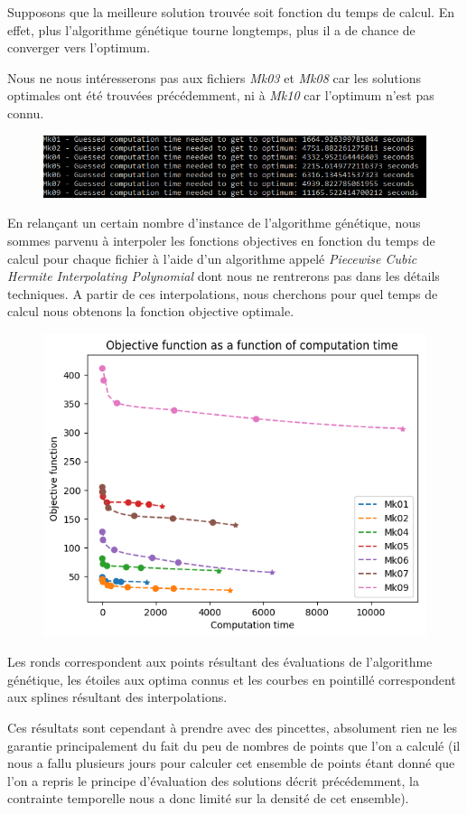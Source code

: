 Supposons que la meilleure solution trouvée soit fonction du temps de calcul. En effet, plus l'algorithme génétique tourne longtemps, plus il a de chance de converger vers l'optimum.

Nous ne nous intéresserons pas aux fichiers \textit{Mk03} et \textit{Mk08} car les solutions optimales ont été trouvées précédemment, ni à \textit{Mk10} car l'optimum n'est pas connu.

\begin{figure}[!h]
    \centering
    \includegraphics[width=\linewidth]{report/Pictures/guessed_computation_time_brandimarte.png}
\end{figure}

En relançant un certain nombre d'instance de l'algorithme génétique, nous sommes parvenu à interpoler les fonctions objectives en fonction du temps de calcul pour chaque fichier à l'aide d'un algorithme appelé \textit{Piecewise Cubic Hermite Interpolating Polynomial} dont nous ne rentrerons pas dans les détails techniques. A partir de ces interpolations, nous cherchons pour quel temps de calcul nous obtenons la fonction objective optimale.

\begin{figure}[!h]
    \centering
    \includegraphics[width=\linewidth]{report/Pictures/objective_function_as_function_of_time.png}
\end{figure}

Les ronds correspondent aux points résultant des évaluations de l'algorithme génétique, les étoiles aux optima connus et les courbes en pointillé correspondent aux splines résultant des interpolations.

Ces résultats sont cependant à prendre avec des pincettes, absolument rien ne les garantie principalement du fait du peu de nombres de points que l'on a calculé (il nous a fallu plusieurs jours pour calculer cet ensemble de points étant donné que l'on a repris le principe d'évaluation des solutions décrit précédemment, la contrainte temporelle nous a donc limité sur la densité de cet ensemble).

\newpage